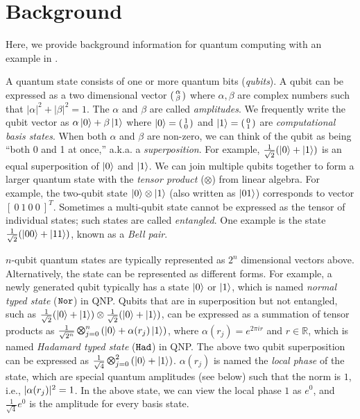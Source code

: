 \section{Background}
\label{sec:background}

Here, we provide background information for quantum computing with an example in \qafny.

 A quantum state consists of one or more quantum bits (\emph{qubits}). A qubit can be expressed as a two dimensional vector $\begin{psmallmatrix} \alpha \\ \beta \end{psmallmatrix}$ where $\alpha,\beta$ are complex numbers such that $|\alpha|^2 + |\beta|^2 = 1$.  The $\alpha$ and $\beta$ are called \emph{amplitudes}. 
%
We frequently write the qubit vector as $\alpha\left\vert{0}\right\rangle + \beta\left\vert{1}\right\rangle$ where $\left\vert{0}\right\rangle = \begin{psmallmatrix} 1 \\ 0 \end{psmallmatrix}$ and $\left\vert{1}\right\rangle = \begin{psmallmatrix} 0 \\ 1 \end{psmallmatrix}$ are \emph{computational basis states}. When both $\alpha$ and $\beta$ are non-zero, we can think of the qubit as being ``both 0 and 1 at once,'' a.k.a. a \emph{superposition}. For example, $\frac{1}{\sqrt{2}}(\left\vert{0}\right\rangle + \left\vert{1}\right\rangle)$ is an equal superposition of $\left\vert{0}\right\rangle$ and $\left\vert{1}\right\rangle$. 
We can join multiple qubits together to form a larger quantum state with the \emph{tensor product} ($\otimes$) from linear algebra. For example, the two-qubit state $\left\vert{0}\right\rangle \otimes \left\vert{1}\right\rangle$ (also written as $\left\vert{01}\right\rangle$) corresponds to vector $[~0~1~0~0~]^T$. 
Sometimes a multi-qubit state cannot be expressed as the tensor of individual states; such states are called \emph{entangled}. One example is the state $\frac{1}{\sqrt{2}}(\left\vert{00}\right\rangle + \left\vert{11}\right\rangle)$, known as a \emph{Bell pair}.

 $n$-qubit quantum states are typically represented as $2^n$ dimensional vectors above. Alternatively, the state can be represented as different forms. For example, a newly generated qubit typically has a state $\left\vert{0}\right\rangle$ or $\left\vert{1}\right\rangle$, which is named \textit{normal typed state} ($\texttt{Nor}$) in QNP. Qubits that are in superposition but not entangled, such as $\frac{1}{\sqrt{2}}(\left\vert{0}\right\rangle + \left\vert{1}\right\rangle)\otimes \frac{1}{\sqrt{2}}(\left\vert{0}\right\rangle + \left\vert{1}\right\rangle)$, can be expressed as a summation of tensor products as $\shad{2^n}{n}{\alpha(r_j)}$, where $\alpha(r_j)=e^{2\pi i r}$ and $r \in \mathbb{R}$, which is named \textit{Hadamard typed state} ($\texttt{Had}$) in QNP. The above two qubit superposition can be expressed as $\shad{4}{2}{}$.
$\alpha(r_j)$ is named the \emph{local phase} of the state, which are special quantum amplitudes (see below) such that the norm is $1$, i.e., $|\alpha(r_j)|^2=1$. In the above state, we can view the local phase $1$ as $e^{0}$, and $\frac{1}{\sqrt{4}}e^{0}$ is the amplitude for every basis state.

